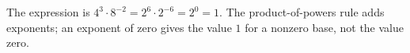 The expression is $4^3\cdot8^{-2}=2^6\cdot2^{-6}=2^0=\boxed1$. The product-of-powers rule adds exponents; an exponent of zero gives the value $1$ for a nonzero base, not the value zero.
